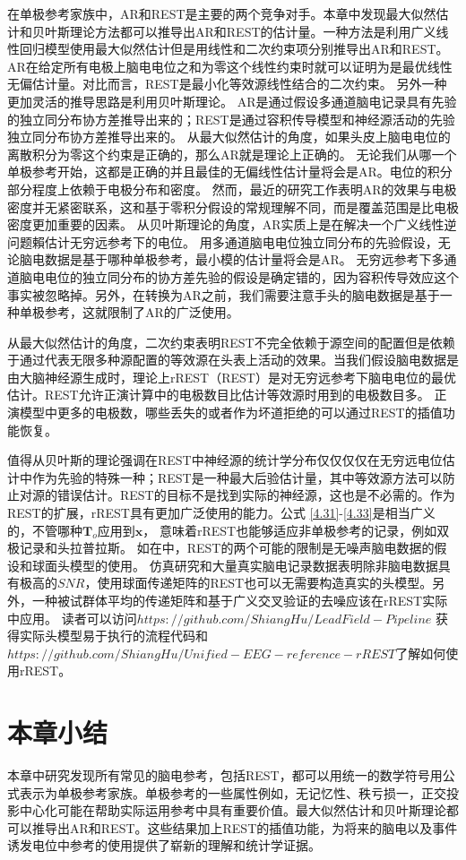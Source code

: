 在单极参考家族中，AR和REST是主要的两个竞争对手。本章中发现最大似然估计和贝叶斯理论方法都可以推导出AR和REST的估计量。一种方法是利用广义线性回归模型使用最大似然估计但是用线性和二次约束项分别推导出AR和REST。 AR在给定所有电极上脑电电位之和为零这个线性约束时就可以证明为是最优线性无偏估计量。对比而言，REST是最小化等效源线性结合的二次约束。
另外一种更加灵活的推导思路是利用贝叶斯理论。 AR是通过假设多通道脑电记录具有先验的独立同分布协方差推导出来的；REST是通过容积传导模型和神经源活动的先验独立同分布协方差推导出来的。 从最大似然估计的角度，如果头皮上脑电电位的离散积分为零这个约束是正确的，那么AR就是理论上正确的。 无论我们从哪一个单极参考开始，这都是正确的并且最佳的无偏线性估计量将会是AR。电位的积分部分程度上依赖于电极分布和密度。 然而，最近的研究工作表明AR的效果与电极密度并无紧密联系，这和基于零积分假设的常规理解不同，而是覆盖范围是比电极密度更加重要的因素。 从贝叶斯理论的角度，AR实质上是在解决一个广义线性逆问题賴估计无穷远参考下的电位。 用多通道脑电电位独立同分布的先验假设，无论脑电数据是基于哪种单极参考，最小模的估计量将会是AR。 无穷远参考下多通道脑电电位的独立同分布的协方差先验的假设是确定错的，因为容积传导效应这个事实被忽略掉。另外，在转换为AR之前，我们需要注意手头的脑电数据是基于一种单极参考，这就限制了AR的广泛使用。

从最大似然估计的角度，二次约束表明REST不完全依赖于源空间的配置但是依赖于通过代表无限多种源配置的等效源在头表上活动的效果。当我们假设脑电数据是由大脑神经源生成时，理论上rREST（REST）是对无穷远参考下脑电电位的最优估计。REST允许正演计算中的电极数目比估计等效源时用到的电极数目多。 正演模型中更多的电极数，哪些丢失的或者作为坏道拒绝的可以通过REST的插值功能恢复。

值得从贝叶斯的理论强调在REST中神经源的统计学分布仅仅仅仅在无穷远电位估计中作为先验的特殊一种；REST是一种最大后验估计量，其中等效源方法可以防止对源的错误估计。REST的目标不是找到实际的神经源，这也是不必需的。作为REST的扩展，rREST具有更加广泛使用的能力。公式 \eqref{4.31}-\eqref{4.33}是相当广义的，不管哪种$\mathbf{T}_o$应用到$\mathbf{x}$， 意味着rREST也能够适应非单极参考的记录，例如双极记录和头拉普拉斯。 如在\cite{hu_unified_2018}中，REST的两个可能的限制是无噪声脑电数据的假设和球面头模型的使用。 仿真研究和大量真实脑电记录数据表明除非脑电数据具有极高的$SNR$，使用球面传递矩阵的REST也可以无需要构造真实的头模型。另外，一种被试群体平均的传递矩阵和基于广义交叉验证的去噪应该在rREST实际中应用。 读者可以访问$https://github.com/ShiangHu/LeadField-
Pipeline$ 获得实际头模型易于执行的流程代码和$https://github.com/ShiangHu/Unified-EEG-reference-rREST$了解如何使用rREST。
\section{本章小结}
本章中研究发现所有常见的脑电参考，包括REST，都可以用统一的数学符号用公式表示为单极参考家族。单极参考的一些属性例如，无记忆性、秩亏损一，正交投影中心化可能在帮助实际运用参考中具有重要价值。最大似然估计和贝叶斯理论都可以推导出AR和REST。这些结果加上REST的插值功能，为将来的脑电以及事件诱发电位中参考的使用提供了崭新的理解和统计学证据。